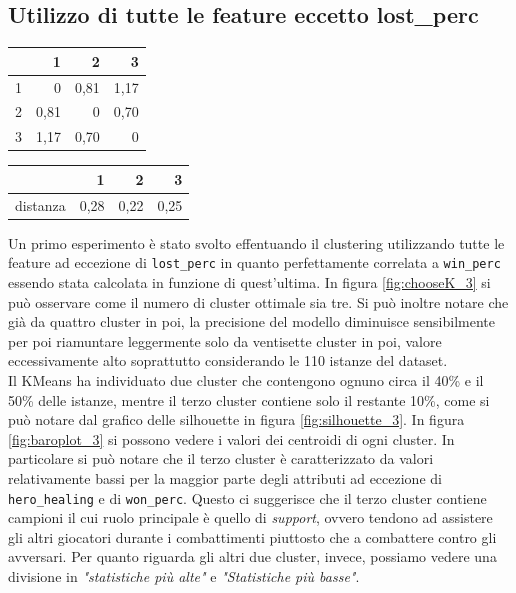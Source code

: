 \documentclass[a4paper,12pt,openany,oneside]{book}
\begin{document}
\subsection{Utilizzo di tutte le feature eccetto lost\_perc}
\begin{table}[!h]
	\scriptsize	
	\centering	
	\begin{tabularx}{0.22\textwidth}{r | rrr} 
		  & 1    & 2    & 3    \\
		  \midrule
		  1 & 0    & 0,81 & 1,17 \\
		  2 & 0,81 & 0    & 0,70 \\
		  3 & 1,17 & 0,70 & 0    \\
	\end{tabularx}
	\hspace{6em}
	\begin{tabularx}{0.27\textwidth}{r | rrr} 
		  & 1    & 2    & 3    \\
		  \midrule
		  distanza & 0,28 & 0,22 & 0,25 \\
	\end{tabularx}
\end{table}
Un primo esperimento è stato svolto effentuando il clustering utilizzando tutte le feature ad eccezione di \verb|lost_perc| in quanto perfettamente correlata a \verb|win_perc| essendo stata calcolata in funzione di quest'ultima. In figura \ref{fig:chooseK_3} si può osservare come il numero di cluster ottimale sia tre. Si può inoltre notare che già da quattro cluster in poi, la precisione del modello diminuisce sensibilmente per poi riamuntare leggermente solo da ventisette cluster in poi, valore eccessivamente alto soprattutto considerando le 110 istanze del dataset.\\
Il KMeans ha individuato due cluster che contengono ognuno circa il 40\% e il 50\% delle istanze, mentre il terzo cluster contiene solo il restante 10\%, come si può notare dal grafico delle silhouette in figura \ref{fig:silhouette_3}.
In figura \ref{fig:baroplot_3} si possono vedere i valori dei centroidi di ogni cluster. In particolare si può notare che il terzo cluster è caratterizzato da valori relativamente bassi per la maggior parte degli attributi ad eccezione di \verb|hero_healing| e di \verb|won_perc|.  Questo ci suggerisce che il terzo cluster contiene campioni il cui ruolo principale è quello di \textit{support}, ovvero tendono ad assistere gli altri giocatori durante i combattimenti piuttosto che a combattere contro gli avversari. Per quanto riguarda gli altri due cluster, invece, possiamo vedere una divisione in \textit{"statistiche più alte"} e \textit{"Statistiche più basse"}.\\
\end{document}
